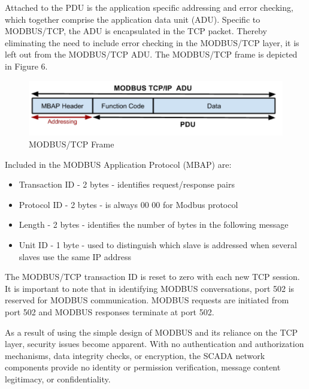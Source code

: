 \documentclass[11pt,]{article}
\begin{document}
Attached to the PDU is the application specific addressing and error
checking, which together comprise the application data unit (ADU).
Specific to MODBUS/TCP, the ADU is encapsulated in the TCP packet.
Thereby eliminating the need to include error checking in the MODBUS/TCP
layer, it is left out from the MODBUS/TCP ADU. The MODBUS/TCP frame is
depicted in Figure 6.

\clearpage

\begin{figure}[top]

{\centering \includegraphics{thesis_files/figure-latex/unnamed-chunk-9-1} 

}

\caption{MODBUS/TCP Frame}\label{fig:unnamed-chunk-9}
\end{figure}

Included in the MODBUS Application Protocol (MBAP) are:

\begin{itemize}
\itemsep1pt\parskip0pt
\item
  Transaction ID - 2 bytes - identifies request/response pairs
\item
  Protocol ID - 2 bytes - is always 00 00 for Modbus protocol
\item
  Length - 2 bytes - identifies the number of bytes in the following
  message
\item
  Unit ID - 1 byte - used to distinguish which slave is addressed when
  several slaves use the same IP address
\end{itemize}

The MODBUS/TCP transaction ID is reset to zero with each new TCP
session. It is important to note that in identifying MODBUS
conversations, port 502 is reserved for MODBUS communication. MODBUS
requests are initiated from port 502 and MODBUS responses terminate at
port 502.

As a result of using the simple design of MODBUS and its reliance on the
TCP layer, security issues become apparent. With no authentication and
authorization mechanisms, data integrity checks, or encryption, the
SCADA network components provide no identity or permission verification,
message content legitimacy, or confidentiality.
\end{document}
